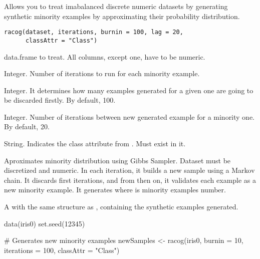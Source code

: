 %
\begin{Description}\relax
Allows you to treat imabalanced discrete numeric datasets by generating
synthetic minority examples by approximating their probability distribution.
\end{Description}
%
\begin{Usage}
\begin{verbatim}
racog(dataset, iterations, burnin = 100, lag = 20, 
      classAttr = "Class")
\end{verbatim}
\end{Usage}
%
\begin{Arguments}
\begin{ldescription}
\item[\code{dataset}] data.frame to treat. All columns, except  one,
have to be numeric.

\item[\code{iterations}] Integer. Number of iterations to run for each minority
example.

\item[\code{burnin}] Integer. It determines how many examples generated for a given
one are going to be discarded firstly. By default, 100.

\item[\code{lag}] Integer. Number of iterations between new generated example for a
minority one. By default, 20.

\item[\code{classAttr}] String. Indicates the class attribute from .
Must exist in it.
\end{ldescription}
\end{Arguments}
%
\begin{Details}\relax
Aproximates minority distribution using Gibbs Sampler. Dataset must be
discretized and numeric. In each iteration, it builds a new sample using a
Markov chain. It discards first  iterations, and from then on,
it validates each  example as a new minority example. It generates
 where  is minority examples number.
\end{Details}
%
\begin{Value}
A  with the same structure as ,
containing the synthetic examples generated.
\end{Value}
%
\begin{Examples}
\begin{ExampleCode}
data(iris0)
set.seed(12345)

# Generates new minority examples
newSamples <- racog(iris0, burnin = 10, iterations = 100, classAttr = "Class")

\end{ExampleCode}
\end{Examples}
